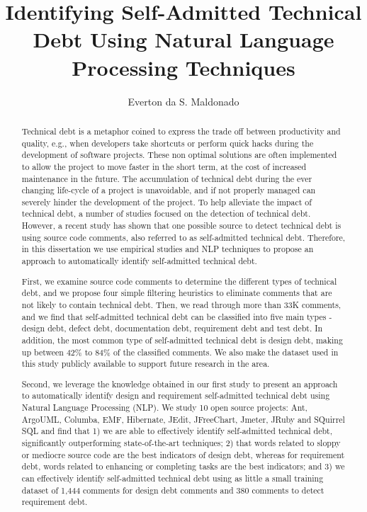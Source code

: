 \documentclass{report}
\author{Everton da S. Maldonado}
\title {Identifying Self-Admitted Technical Debt Using Natural Language Processing Techniques}
\newcommand{\SATD}{self-admitted technical debt\xspace}
\begin{document}
\begin{abstract}

Technical debt is a metaphor coined to express the trade off between productivity and quality, e.g., when developers take shortcuts or perform quick hacks during the development of software projects. These non optimal solutions are often implemented to allow the project to move faster in the short term, at the cost of increased maintenance in the future. The accumulation of technical debt during the ever changing life-cycle of a project is unavoidable, and if not properly managed can severely hinder the development of the project. To help alleviate the impact of technical debt, a number of studies focused on the detection of technical debt. However, a recent study has shown that one possible source to detect technical debt is using source code comments, also referred to as self-admitted technical debt. Therefore, in this dissertation we use empirical studies and NLP techniques to propose an approach to automatically identify \SATD. 

First, we examine source code comments to determine the different types of technical debt, and we propose four simple filtering heuristics to eliminate comments that are not likely to contain technical debt. Then, we read through more than 33K comments, and we find that self-admitted technical debt can be classified into five main types - design debt, defect debt, documentation debt, requirement debt and test debt. In addition, the  most common type of self-admitted technical debt is design debt, making up between 42\% to 84\% of the classified comments. We also make the dataset used in this study publicly available to support future research in the area. 

Second, we leverage the knowledge obtained in our first study to present an approach to automatically identify design and requirement self-admitted technical debt using Natural Language Processing (NLP). We study 10 open source projects: Ant, ArgoUML, Columba, EMF, Hibernate, JEdit, JFreeChart, Jmeter, JRuby and SQuirrel SQL and find that 1) we are able to effectively identify self-admitted technical debt, significantly outperforming state-of-the-art techniques; 2) that words related to sloppy or mediocre source code are the best indicators of design debt, whereas for requirement debt, words related to enhancing or completing tasks are the best indicators; and 3) we can effectively identify self-admitted technical debt using as little a small training dataset of 1,444 comments for design debt comments and 380 comments to detect requirement debt.

\end{abstract}
\end{document}
